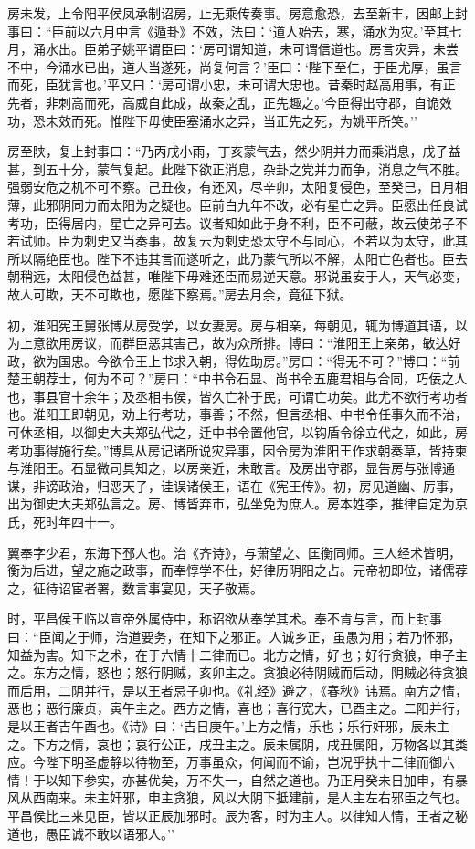 \documentclass[]{article}
\begin{document}
房未发，上令阳平侯凤承制诏房，止无乘传奏事。房意愈恐，去至新丰，因邮上封事曰：``臣前以六月中言《遁卦》不效，法曰：`道人始去，寒，涌水为灾。'至其七月，涌水出。臣弟子姚平谓臣曰：`房可谓知道，未可谓信道也。房言灾异，未尝不中，今涌水已出，道人当遂死，尚复何言？'臣曰：`陛下至仁，于臣尤厚，虽言而死，臣犹言也。'平又曰：`房可谓小忠，未可谓大忠也。昔秦时赵高用事，有正先者，非刺高而死，高威自此成，故秦之乱，正先趣之。'今臣得出守郡，自诡效功，恐未效而死。惟陛下毋使臣塞涌水之异，当正先之死，为姚平所笑。''

房至陕，复上封事曰：``乃丙戌小雨，丁亥蒙气去，然少阴并力而乘消息，戊子益甚，到五十分，蒙气复起。此陛下欲正消息，杂卦之党并力而争，消息之气不胜。强弱安危之机不可不察。己丑夜，有还风，尽辛卯，太阳复侵色，至癸巳，日月相薄，此邪阴同力而太阳为之疑也。臣前白九年不改，必有星亡之异。臣愿出任良试考功，臣得居内，星亡之异可去。议者知如此于身不利，臣不可蔽，故云使弟子不若试师。臣为刺史又当奏事，故复云为刺史恐太守不与同心，不若以为太守，此其所以隔绝臣也。陛下不违其言而遂听之，此乃蒙气所以不解，太阳亡色者也。臣去朝稍远，太阳侵色益甚，唯陛下毋难还臣而易逆天意。邪说虽安于人，天气必变，故人可欺，天不可欺也，愿陛下察焉。''房去月余，竟征下狱。

初，淮阳宪王舅张博从房受学，以女妻房。房与相亲，每朝见，辄为博道其语，以为上意欲用房议，而群臣恶其害己，故为众所排。博曰：``淮阳王上亲弟，敏达好政，欲为国忠。今欲令王上书求入朝，得佐助房。''房曰：``得无不可？''博曰：``前楚王朝荐士，何为不可？''房曰：``中书令石显、尚书令五鹿君相与合同，巧佞之人也，事县官十余年；及丞相韦侯，皆久亡补于民，可谓亡功矣。此尤不欲行考功者也。淮阳王即朝见，劝上行考功，事善；不然，但言丞相、中书令任事久而不治，可休丞相，以御史大夫郑弘代之，迁中书令置他官，以钩盾令徐立代之，如此，房考功事得施行矣。''博具从房记诸所说灾异事，因令房为淮阳王作求朝奏草，皆持柬与淮阳王。石显微司具知之，以房亲近，未敢言。及房出守郡，显告房与张博通谋，非谤政治，归恶天子，诖误诸侯王，语在《宪王传》。初，房见道幽、厉事，出为御史大夫郑弘言之。房、博皆弃市，弘坐免为庶人。房本姓李，推律自定为京氏，死时年四十一。

翼奉字少君，东海下邳人也。治《齐诗》，与萧望之、匡衡同师。三人经术皆明，衡为后进，望之施之政事，而奉惇学不仕，好律历阴阳之占。元帝初即位，诸儒荐之，征待诏宦者署，数言事宴见，天子敬焉。

时，平昌侯王临以宣帝外属侍中，称诏欲从奉学其术。奉不肯与言，而上封事曰：``臣闻之于师，治道要务，在知下之邪正。人诚乡正，虽愚为用；若乃怀邪，知益为害。知下之术，在于六情十二律而已。北方之情，好也；好行贪狼，申子主之。东方之情，怒也；怒行阴贼，亥卯主之。贪狼必待阴贼而后动，阴贼必待贪狼而后用，二阴并行，是以王者忌子卯也。《礼经》避之，《春秋》讳焉。南方之情，恶也；恶行廉贞，寅午主之。西方之情，喜也；喜行宽大，已酉主之。二阳并行，是以王者吉午酉也。《诗》曰：`吉日庚午。'上方之情，乐也；乐行奸邪，辰未主之。下方之情，哀也；哀行公正，戌丑主之。辰未属阴，戌丑属阳，万物各以其类应。今陛下明圣虚静以待物至，万事虽众，何闻而不谕，岂况乎执十二律而御六情！于以知下参实，亦甚优矣，万不失一，自然之道也。乃正月癸未日加申，有暴风从西南来。未主奸邪，申主贪狼，风以大阴下抵建前，是人主左右邪臣之气也。平昌侯比三来见臣，皆以正辰加邪时。辰为客，时为主人。以律知人情，王者之秘道也，愚臣诚不敢以语邪人。''
\end{document}
